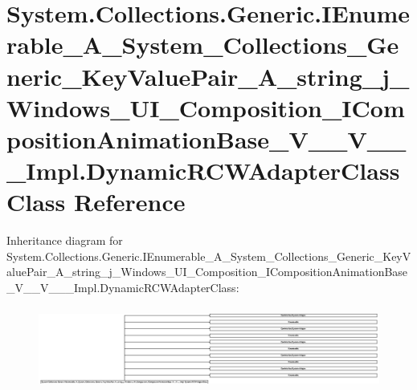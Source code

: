 \hypertarget{class_system_1_1_collections_1_1_generic_1_1_i_enumerable___a___system___collections___generic__17f614fad6ce73cc76758a04e4f94ff8}{}\section{System.\+Collections.\+Generic.\+I\+Enumerable\+\_\+\+A\+\_\+\+System\+\_\+\+Collections\+\_\+\+Generic\+\_\+\+Key\+Value\+Pair\+\_\+\+A\+\_\+string\+\_\+j\+\_\+\+Windows\+\_\+\+U\+I\+\_\+\+Composition\+\_\+\+I\+Composition\+Animation\+Base\+\_\+\+V\+\_\+\+\_\+\+V\+\_\+\+\_\+\+\_\+\+Impl.\+Dynamic\+R\+C\+W\+Adapter\+Class Class Reference}
\label{class_system_1_1_collections_1_1_generic_1_1_i_enumerable___a___system___collections___generic__17f614fad6ce73cc76758a04e4f94ff8}
Inheritance diagram for System.\+Collections.\+Generic.\+I\+Enumerable\+\_\+\+A\+\_\+\+System\+\_\+\+Collections\+\_\+\+Generic\+\_\+\+Key\+Value\+Pair\+\_\+\+A\+\_\+string\+\_\+j\+\_\+\+Windows\+\_\+\+U\+I\+\_\+\+Composition\+\_\+\+I\+Composition\+Animation\+Base\+\_\+\+V\+\_\+\+\_\+\+V\+\_\+\+\_\+\+\_\+\+Impl.\+Dynamic\+R\+C\+W\+Adapter\+Class\+:\begin{figure}[H]
\begin{center}
\leavevmode
\includegraphics[height=2.720848cm]{class_system_1_1_collections_1_1_generic_1_1_i_enumerable___a___system___collections___generic__17f614fad6ce73cc76758a04e4f94ff8}
\end{center}
\end{figure}
